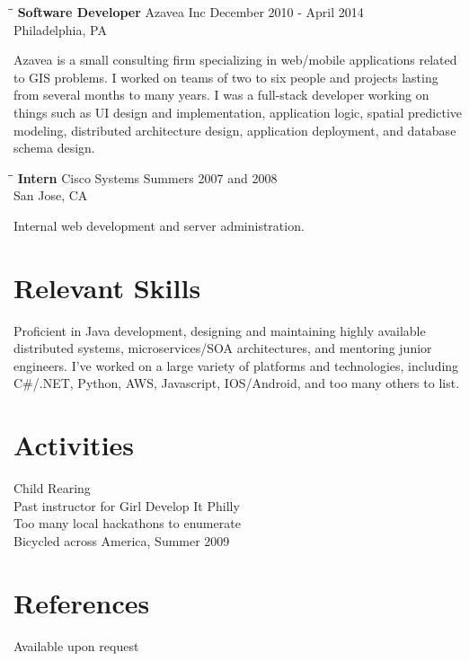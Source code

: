 \documentclass{res}
\begin{document}
\begin{resume}
\begin{tabbing}
   \hspace{2.2in}\= \hspace{2.2in}\= \kill %
    {\bf Software Developer} \>Azavea Inc     \>December 2010 - April 2014\\
                             \>Philadelphia, PA
   \end{tabbing}\vspace{-17pt}      %
   Azavea is a small consulting firm specializing in web/mobile
   applications related to GIS problems.  I worked
   on teams of two to six people and projects lasting from
   several months to many years.  I was a full-stack developer working on
   things such as UI design and implementation, application logic, spatial
   predictive modeling, distributed architecture design, application
   deployment, and database schema design.
   \begin{tabbing}%
   \hspace{2.2in}\= \hspace{2.2in}\= \kill %
   {\bf Intern}  \> Cisco Systems\> Summers 2007 and 2008\\
                          \> San Jose, CA
   \end{tabbing}\vspace{-17pt}
   Internal web development and server administration.


\section{Relevant Skills}
Proficient in Java development, designing and maintaining highly available distributed systems, microservices/SOA architectures, and mentoring junior engineers.  I've worked on a large variety of platforms and technologies, including C\#/.NET, Python, AWS, Javascript, IOS/Android, and too many others to list.
 
\section{Activities}
    Child Rearing\\
    Past instructor for Girl Develop It Philly\\
    Too many local hackathons to enumerate\\
    Bicycled across America, Summer 2009

\section{References}
    Available upon request
 
\end{resume}
\end{document}
